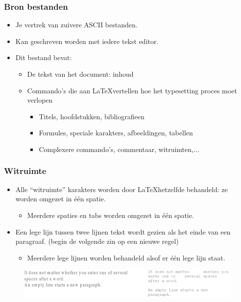 \documentclass{beamer}
\begin{document}
\begin{frame}
\frametitle{Bron bestanden}
\begin{itemize}
 \item Je vertrek van zuivere ASCII bestanden.
 \item Kan geschreven worden met iedere tekst editor.
 \pause
 \item Dit bestand bevat:
 \begin{itemize}
  \item De tekst van het document: inhoud
  \item Commando's die aan \LaTeX vertellen hoe het typesetting proces moet verlopen
  \begin{itemize}
   \item Titels, hoofdstukken, bibliografieen
   \item Formules, speciale karakters, afbeeldingen, tabellen
   \item Complexere commando's, commentaar, witruimten,...   
  \end{itemize}
 \end{itemize}
\end{itemize}
\end{frame}


\begin{frame}
\frametitle{Witruimte}
\begin{itemize}
 \item <1-> Alle ``witruimte'' karakters worden door \LaTeX hetzelfde behandeld: ze worden omgezet in \'e\'en spatie.
    \begin{itemize}
      \item Meerdere spaties en tabs worden omgezet in \'e\'en spatie.
    \end{itemize}
 \item <2-> Een lege lijn tussen twee lijnen tekst wordt gezien als het einde van een paragraaf. (begin de volgende zin op een nieuwe regel)
      \begin{itemize}
      \item Meerdere lege lijnen worden behandeld alsof er \'e\'en lege lijn staat.
      \end{itemize}
\end{itemize}
\begin{figure}[h] 
  \includegraphics[width=1\textwidth]{images/spaces.png}
\end{figure}
\end{frame}
\end{document}

